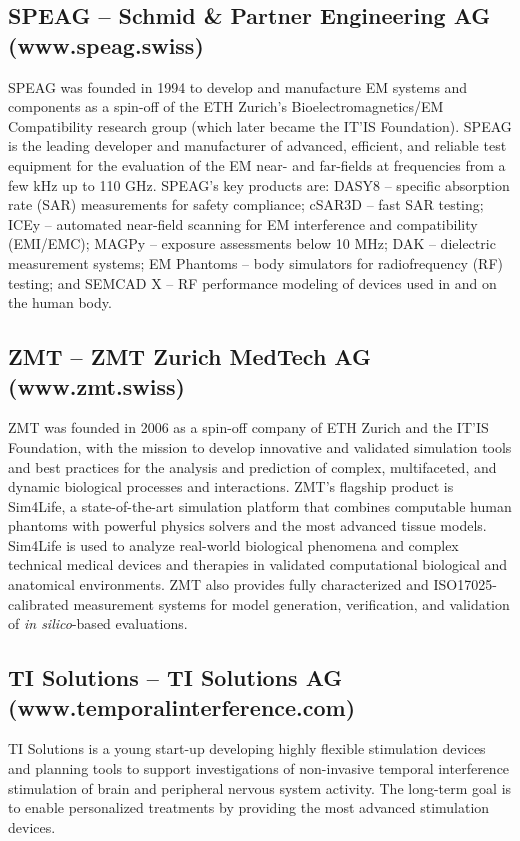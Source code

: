 \subsection*{SPEAG – Schmid \& Partner Engineering AG (www.speag.swiss)}
SPEAG was founded in 1994 to develop and manufacture EM systems and components as a spin-off of the ETH Zurich’s Bioelectromagnetics/EM Compatibility research group (which later became the IT’IS Foundation). SPEAG is the leading developer and manufacturer of advanced, efficient, and reliable test equipment for the evaluation of the EM near- and far-fields at frequencies from a few kHz up to 110 GHz. SPEAG’s key products are: DASY8 – specific absorption rate (SAR) measurements for safety compliance; cSAR3D – fast SAR testing; ICEy – automated near-field scanning for EM interference and compatibility (EMI/EMC); MAGPy – exposure assessments below 10 MHz; DAK – dielectric measurement systems; EM Phantoms – body simulators for radiofrequency (RF) testing; and SEMCAD X – RF performance modeling of devices used in and on the human body.

\subsection*{ZMT – ZMT Zurich MedTech AG (www.zmt.swiss)}
ZMT was founded in 2006 as a spin-off company of ETH Zurich and the IT’IS Foundation, with the mission to develop innovative and validated simulation tools and best practices for the analysis and prediction of complex, multifaceted, and dynamic biological processes and interactions. ZMT’s flagship product is Sim4Life, a state-of-the-art simulation platform that combines computable human phantoms with powerful physics solvers and the most advanced tissue models. Sim4Life is used to analyze real-world biological phenomena and complex technical medical devices and therapies in validated computational biological and anatomical environments. ZMT also provides fully characterized and ISO17025-calibrated measurement systems for model generation, verification, and validation of \textit{in silico}-based evaluations. 

\subsection*{TI Solutions – TI Solutions AG (www.temporalinterference.com)}
TI Solutions is a young start-up developing highly flexible stimulation devices and planning tools to support investigations of non-invasive temporal interference stimulation of brain and peripheral nervous system activity. The long-term goal is to enable personalized treatments by providing the most advanced stimulation devices. 

